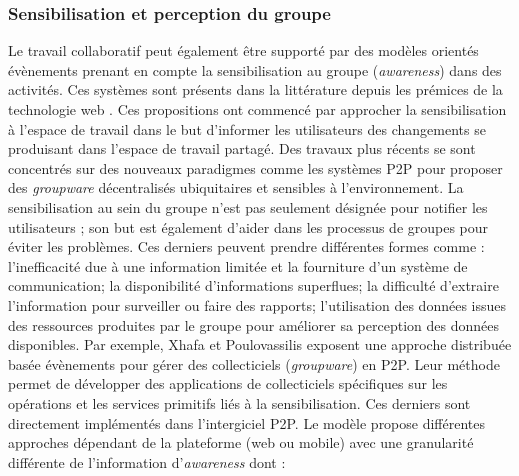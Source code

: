 \subsubsection{Sensibilisation et perception du groupe}
Le travail collaboratif peut également être supporté par des modèles orientés 
évènements prenant en compte la sensibilisation au groupe (\textit{awareness}) 
dans des activités. Ces systèmes sont présents dans la littérature depuis les 
prémices de la technologie web \cite{Bentley1997,Steinfield1999,You2001}. Ces 
propositions ont commencé par approcher la sensibilisation à l'espace de travail 
dans le but d'informer les utilisateurs des changements se produisant dans 
l'espace 
de travail partagé. 
Des travaux plus récents se sont concentrés sur des 
nouveaux paradigmes comme les systèmes \gls{P2P} pour proposer des 
\textit{groupware} décentralisés ubiquitaires et sensibles à l'environnement. La 
sensibilisation au sein du groupe n'est pas seulement désignée 
pour notifier les utilisateurs ; son but est également d'aider dans les processus de 
groupes pour éviter les problèmes. Ces derniers peuvent prendre différentes 
formes comme :  l'inefficacité due à une information limitée et la fourniture d'un 
système de communication; la disponibilité d'informations superflues; la difficulté 
d'extraire l'information pour surveiller ou faire des rapports; l'utilisation des 
données issues des ressources produites par le groupe pour améliorer sa 
perception des données disponibles. Par exemple, Xhafa et Poulovassilis 
\cite{Xhafa2010} exposent une approche distribuée basée évènements pour gérer 
des collecticiels (\textit{groupware}) en \gls{P2P}. 
Leur méthode permet de développer des applications de collecticiels spécifiques  
sur les opérations et les services primitifs liés à la sensibilisation. Ces derniers 
sont directement implémentés dans l'intergiciel \gls{P2P}. Le modèle propose 
différentes approches dépendant de la plateforme (web ou mobile) avec une 
granularité différente de l'information 
d'\textit{awareness} dont :

